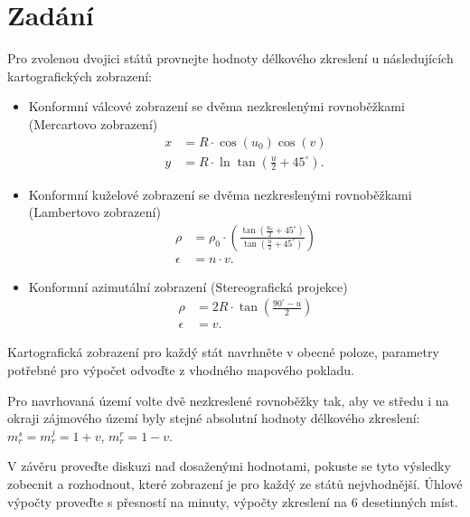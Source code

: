 \section{Zadání}
Pro zvolenou dvojici států provnejte hodnoty délkového zkreslení u následujících kartografických zobrazení:
\begin{itemize}
    \item Konformní válcové zobrazení se dvěma nezkreslenými rovnoběžkami (Mercartovo zobrazení)
    \begin{align*}
x &= R \cdot \cos(u_0)\cos(v) \\
y &= R \cdot \ln\tan(\frac{u}{2}+45^\circ).
    \end{align*}
\item Konformní kuželové zobrazení se dvěma nezkreslenými rovnoběžkami (Lambertovo zobrazení)
    \begin{align*}
\rho &= \rho_0 \cdot \left(\frac{\tan(\frac{u_o}{2}+45^\circ)}{\tan(\frac{u}{2}+45^\circ)}\right) \\
\epsilon &= n \cdot v.
    \end{align*}
\item Konformní azimutální zobrazení (Stereografická projekce)
    \begin{align*}
\rho &= 2R \cdot \tan \left(\frac{90^\circ-u}{2}\right) \\
\epsilon &=  v.
    \end{align*}
\end{itemize}

Kartografická zobrazení pro každý stát navrhněte v obecné poloze, parametry potřebné pro výpočet odvoďte z vhodného mapového pokladu. 

Pro navrhovaná území volte dvě nezkreslené rovnoběžky tak, aby ve středu i na okraji zájmového území byly stejné absolutní hodnoty délkového zkreslení: $m_r^s = m_r^j = 1 +v$, $m_r^r = 1 -v$.

V závěru proveďte diskuzi nad dosaženými hodnotami, pokuste se tyto výsledky zobecnit a rozhodnout, které zobrazení je pro každý ze států nejvhodnější.
Úhlové výpočty proveďte s přesností na minuty, výpočty zkreslení na 6 desetinných míst.

